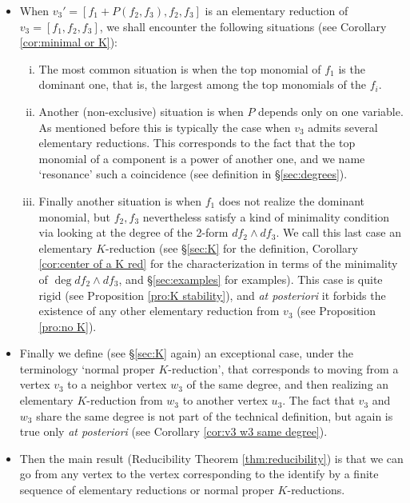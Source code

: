 \documentclass[reqno,oneside,11pt]{amsart}
\theoremstyle{plain}
\theoremstyle{definition}
\begin{document}
\begin{itemize}[wide]
\item When $v_3' = [f_1 + P(f_2, f_3), f_2, f_3]$ is an elementary reduction of $v_3=[f_1, f_2, f_3]$, we shall encounter the following situations (see Corollary \ref{cor:minimal or K}):
\begin{enumerate}[(i), wide]
\item The most common situation is when the top monomial of $f_1$ is the dominant one, that is, the largest among the top monomials of the $f_i$.

\item 
Another (non-exclusive) situation is when $P$ depends only on one variable.
As mentioned before this is typically the case when $v_3$ admits several elementary reductions.
This corresponds to the fact that the top monomial of a component is a power of another one, and we name `resonance' such a coincidence (see definition in \S\ref{sec:degrees}).

\item
Finally another situation is when $f_1$ does not realize the dominant monomial, but $f_2, f_3$ nevertheless satisfy a kind of minimality condition via looking at the degree of the 2-form $df_2 \wedge df_3$.
We call this last case an elementary $K$-reduction (see \S\ref{sec:K} for the definition, Corollary \ref{cor:center of a K red} for the characterization in terms of the minimality of $\deg df_2 \wedge df_3$, and \S\ref{sec:examples} for examples).
This case is quite rigid (see Proposition \ref{pro:K stability}), and \textit{at posteriori} it forbids the
existence of any other elementary reduction from $v_3$ (see Proposition \ref{pro:no K}).
\end{enumerate}

\item Finally we define (see \S\ref{sec:K} again) an exceptional case, under the terminology  `normal proper $K$-reduction', that corresponds to moving from a vertex $v_3$ to a neighbor vertex $w_3$ of the same degree, and then realizing an elementary $K$-reduction from $w_3$ to another vertex $u_3$.
The fact that $v_3$ and $w_3$ share the same degree is not part of the technical definition, but again is true only \textit{at posteriori} (see Corollary \ref{cor:v3 w3 same degree}).

\item Then the main result (Reducibility Theorem \ref{thm:reducibility}) is that we can go from any vertex to the vertex corresponding to the identify by a finite sequence of elementary reductions or normal proper $K$-reductions.


\end{itemize}
\end{document}
